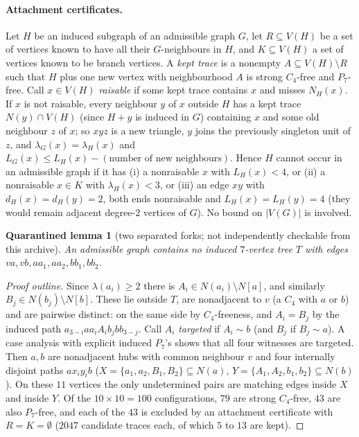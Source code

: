 \documentclass[11pt]{amsart}
\newtheorem{qlemma}[theorem]{Quarantined lemma}
\theoremstyle{definition}
\theoremstyle{remark}
\begin{document}
\paragraph{Attachment certificates.} Let $H$ be an induced subgraph of an admissible graph $G$, let $R\subseteq V(H)$ be a set of vertices known to have all their $G$-neighbours in $H$, and $K\subseteq V(H)$ a set of vertices known to be branch vertices. A \emph{kept trace} is a nonempty $A\subseteq V(H)\setminus R$ such that $H$ plus one new vertex with neighbourhood $A$ is strong $C_4$-free and $P_7$-free. Call $x\in V(H)$ \emph{raisable} if some kept trace contains $x$ and misses $N_H(x)$. If $x$ is not raisable, every neighbour $y$ of $x$ outside $H$ has a kept trace $N(y)\cap V(H)$ (since $H+y$ is induced in $G$) containing $x$ and some old neighbour $z$ of $x$; so $xyz$ is a new triangle, $y$ joins the previously singleton unit of $z$, and $\lambda_G(x)=\lambda_H(x)$ and $L_G(x)\le L_H(x)-(\text{number of new neighbours})$. Hence $H$ cannot occur in an admissible graph if it has (i) a nonraisable $x$ with $L_H(x)<4$, or (ii) a nonraisable $x\in K$ with $\lambda_H(x)<3$, or (iii) an edge $xy$ with $d_H(x)=d_H(y)=2$, both ends nonraisable and $L_H(x)=L_H(y)=4$ (they would remain adjacent degree-$2$ vertices of $G$). No bound on $|V(G)|$ is involved.

\begin{qlemma}[two separated forks; not independently checkable from this archive]\label{lem:forks}
An admissible graph contains no induced $7$-vertex tree $T$ with edges $va,vb,aa_1,aa_2,bb_1,bb_2$.
\end{qlemma}

\begin{proof}[Proof outline]
Since $\lambda(a_i)\ge2$ there is $A_i\in N(a_i)\setminus N[a]$, and similarly $B_j\in N(b_j)\setminus N[b]$. These lie outside $T$, are nonadjacent to $v$ (a $C_4$ with $a$ or $b$) and are pairwise distinct: on the same side by $C_4$-freeness, and $A_i=B_j$ by the induced path $a_{3-i}aa_iA_ib_jbb_{3-j}$. Call $A_i$ \emph{targeted} if $A_i\sim b$ (and $B_j$ if $B_j\sim a$). A case analysis with explicit induced $P_7$'s shows that all four witnesses are targeted. Then $a,b$ are nonadjacent hubs with common neighbour $v$ and four internally disjoint paths $ax_iy_ib$ ($X=\{a_1,a_2,B_1,B_2\}\subseteq N(a)$, $Y=\{A_1,A_2,b_1,b_2\}\subseteq N(b)$). On these $11$ vertices the only undetermined pairs are matching edges inside $X$ and inside $Y$. Of the $10\times10=100$ configurations, $79$ are strong $C_4$-free, $43$ are also $P_7$-free, and each of the $43$ is excluded by an attachment certificate with $R=K=\emptyset$ ($2047$ candidate traces each, of which $5$ to $13$ are kept).
\end{proof}
\end{document}
